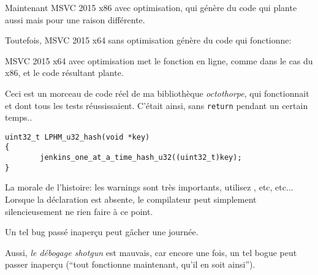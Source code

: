 Maintenant MSVC 2015 x86 avec optimisation, qui génère du code qui plante aussi mais
pour une raison différente.



Toutefois, MSVC 2015 x64 sans optimisation génère du code qui fonctionne:



MSVC 2015 x64 avec optimisation met le fonction en ligne, comme dans le cas du x86,
et le code résultant plante.

\myhrule{}

Ceci est un morceau de code réel de ma bibliothèque \emph{octothorpe},
qui fonctionnait et dont tous les tests réussissaient.
C'était ainsi, sans \verb|return| pendant un certain temps..

\begin{lstlisting}
uint32_t LPHM_u32_hash(void *key)
{
        jenkins_one_at_a_time_hash_u32((uint32_t)key);
}
\end{lstlisting}

\myhrule{}

La morale de l'histoire: les warnings sont très importants, utilisez , etc, etc...
Lorsque la déclaration  est absente, le compilateur peut simplement silencieusement
ne rien faire à ce point.

Un tel bug passé inaperçu peut gâcher une journée.

Aussi, \emph{le débogage shotgun}
est mauvais, car encore une fois, un tel bogue peut passer inaperçu (``tout fonctionne
maintenant, qu'il en soit ainsi'').



